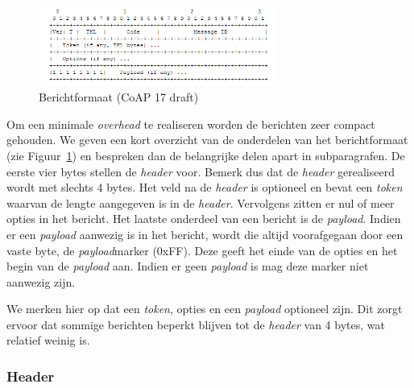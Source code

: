 \begin{figure}
\vspace{-20pt}
\includegraphics[width=0.7\textwidth]{fig/CoAPMessageFormat}
\vspace{-30pt}
\caption{Berichtformaat (CoAP 17 draft)}
\vspace{-10pt}
\label{fig:CoAPMessageFormat}
\end{figure}
Om een minimale \textit{overhead} te realiseren worden de berichten zeer compact gehouden. We geven een kort overzicht van de onderdelen van het berichtformaat (zie Figuur~\ref{fig:CoAPMessageFormat}) en bespreken dan de belangrijke delen apart in subparagrafen. De eerste vier bytes stellen de \textit{header} voor. Bemerk dus dat de \textit{header} gerealiseerd wordt met slechts 4 bytes. Het veld na de \textit{header} is optioneel en bevat een \textit{\textit{token}} waarvan de lengte aangegeven is in de \textit{header}. Vervolgens zitten er nul of meer opties in het bericht.
Het laatste onderdeel van een bericht is de \textit{payload}. Indien er een \textit{payload} aanwezig is in het bericht, wordt die altijd voorafgegaan door een vaste byte, de \textit{payload}marker (0xFF). Deze geeft het einde van de opties en het begin van de \textit{payload} aan. Indien er geen \textit{payload} is mag deze marker niet aanwezig zijn.

We merken hier op dat een \textit{token}, opties en een \textit{payload} optioneel zijn. Dit zorgt ervoor dat sommige berichten beperkt blijven tot de \textit{header} van 4 bytes, wat relatief weinig is.

\subsubsection{Header}

